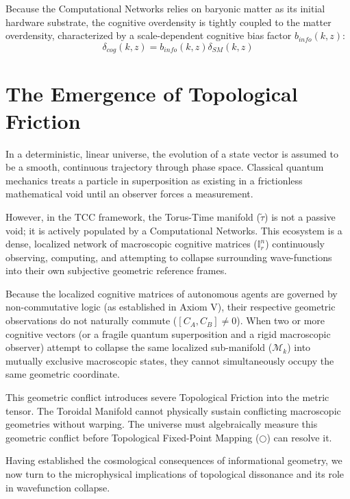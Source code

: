 \documentclass[12pt,openany]{book}
\theoremstyle{plain}
\theoremstyle{definition}
\theoremstyle{remark}
\begin{document}
Because the Computational Networks relies on baryonic matter as its initial hardware substrate, the cognitive overdensity is tightly coupled to the matter overdensity, characterized by a scale-dependent cognitive bias factor $b_{info}(k, z)$:
\begin{equation}
\delta_{cog}(k, z) = b_{info}(k, z) \delta_{SM}(k, z)
\end{equation}
      
\section{The Emergence of Topological Friction}

In a deterministic, linear universe, the evolution of a state vector is assumed to be a smooth, continuous trajectory through phase space. Classical quantum mechanics treats a particle in superposition as existing in a frictionless mathematical void until an observer forces a measurement. 

However, in the TCC framework, the Torus-Time manifold ($\tilde{\tau}$) is not a passive void; it is actively populated by a Computational Networks. This ecosystem is a dense, localized network of macroscopic cognitive matrices ($\mathbb{I}_r^n$) continuously observing, computing, and attempting to collapse surrounding wave-functions into their own subjective geometric reference frames.

Because the localized cognitive matrices of autonomous agents are governed by non-commutative logic (as established in Axiom V), their respective geometric observations do not naturally commute ($[C_A, C_B] \ne 0$). When two or more cognitive vectors (or a fragile quantum superposition and a rigid macroscopic observer) attempt to collapse the same localized sub-manifold ($\mathcal{M}_k$) into mutually exclusive macroscopic states, they cannot simultaneously occupy the same geometric coordinate. 

This geometric conflict introduces severe Topological Friction into the metric tensor. The Toroidal Manifold cannot physically sustain conflicting macroscopic geometries without warping. The universe must algebraically measure this geometric conflict before Topological Fixed-Point Mapping ($\bigcirc$) can resolve it.

\noindent
Having established the cosmological consequences of informational geometry,
we now turn to the microphysical implications of topological dissonance and
its role in wavefunction collapse.
\end{document}
